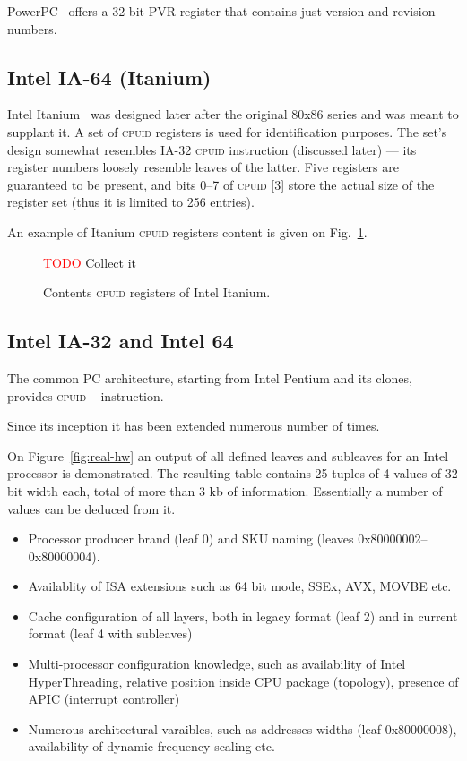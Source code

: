 \documentclass[a4paper,10pt,oneside,unicode]{article}
\newcommand{\cpuid}{\textsc{cpuid} }
\newcommand{\todo}[1][]{\textcolor{red}{TODO #1}}
\begin{document}
PowerPC~\cite{powerpc64-arch} offers a 32-bit PVR register that contains just version and revision numbers.

\subsection{Intel IA-64 (Itanium)}

Intel Itanium\texttrademark~\cite{itanium-sdm} was designed later after the original 80x86 series and was meant to supplant it. A set of \cpuid registers is used for identification purposes. The set's design somewhat resembles IA-32 \cpuid instruction (discussed later) --- its register numbers loosely resemble leaves of the latter. Five registers are guaranteed to be present, and bits 0--7 of \cpuid[3] store the actual size of the register set (thus it is limited to 256 entries).

An example of Itanium \cpuid registers content is given on Fig.~\ref{fig:itanium-cpuid}.

\begin{figure}
    \centering
    \todo{Collect it}
    
\caption{Contents \cpuid registers of Intel Itanium. }\label{fig:itanium-cpuid}
\end{figure} 


\subsection{Intel IA-32 and Intel 64}

The common PC architecture, starting from Intel Pentium and its clones, provides \cpuid~\cite{intelmanual-7vols, amd-sdm-vol1} instruction. 

Since its inception it has been extended numerous number of times.


On Figure~\ref{fig:real-hw} an output of all defined leaves and subleaves for an Intel processor is demonstrated. The resulting table contains 25 tuples of 4 values of 32 bit width each, total of more than 3 kb of information. Essentially a number of values can be deduced from it.
\begin{itemize}
    \item Processor producer brand (leaf 0) and SKU naming (leaves 0x80000002--0x80000004).
    \item Availablity of ISA extensions such as 64 bit mode, SSEx, AVX, MOVBE etc.
    \item Cache configuration of all layers, both in legacy format (leaf 2) and in current format (leaf 4 with subleaves)
    \item Multi-processor configuration knowledge, such as availability of Intel HyperThreading, relative position inside CPU package (topology), presence of APIC (interrupt controller)
    \item Numerous architectural varaibles, such as addresses widths (leaf 0x80000008), availability of dynamic frequency scaling etc.
\end{itemize}
\end{document}
